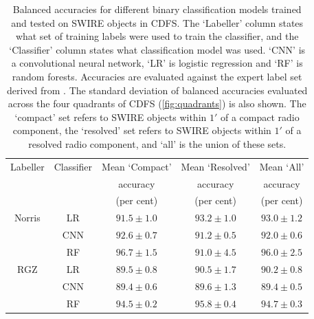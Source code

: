   \begin{table}
    \caption[Balanced accuracies for different binary classification models on CDFS.]{Balanced accuracies for different binary classification models trained and tested on SWIRE objects in CDFS.
    The `Labeller' column states what set of training labels
    were used to train the classifier, and the `Classifier' column states what
    classification model was used. `CNN' is a convolutional neural network,
    `LR' is logistic regression and `RF' is random forests. Accuracies are evaluated against the expert
    label set derived from \citet{norris06}. The standard deviation of balanced accuracies evaluated across the four quadrants of
    CDFS (\autoref{fig:quadrants}) is also shown. The `compact' set refers to SWIRE
    objects within $1'$ of a compact radio component, the `resolved' set refers to
    SWIRE objects within $1'$ of a resolved radio component, and `all' is the union of these sets.}
    \label{tab:cdfs-ba}
    \small\centering
    \begingroup
    \setlength{\tabcolsep}{8pt} %
    \begin{tabular}{ccccc}
    \hline\hline
    Labeller & Classifier & Mean `Compact' & Mean `Resolved' & Mean `All'\\
     &  & accuracy & accuracy & accuracy\\
     &  & (per cent) & (per cent) & (per cent)\\
    \hline
    Norris & LR & $91.5 \pm 1.0$ & $93.2 \pm 1.0$ & $93.0 \pm 1.2$\\
     & CNN & $92.6 \pm 0.7$ & $91.2 \pm 0.5$ & $92.0 \pm 0.6$\\
     & RF & $96.7 \pm 1.5$ & $91.0 \pm 4.5$ & $96.0 \pm 2.5$\\
    RGZ & LR & $89.5 \pm 0.8$ & $90.5 \pm 1.7$ & $90.2 \pm 0.8$\\
     & CNN & $89.4 \pm 0.6$ & $89.6 \pm 1.3$ & $89.4 \pm 0.5$\\
     & RF & $94.5 \pm 0.2$ & $95.8 \pm 0.4$ & $94.7 \pm 0.3$\\
    \hline\hline
    \end{tabular}
    \endgroup
  \end{table}

